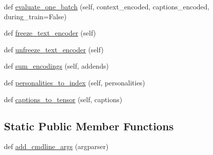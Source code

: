 \begin{DoxyCompactItemize}
\item 
def \hyperlink{classprojects_1_1personality__captions_1_1transresnet_1_1modules_1_1TransresnetModel_aeabd7be189bc8127923aa8b424615110}{evaluate\+\_\+one\+\_\+batch} (self, context\+\_\+encoded, captions\+\_\+encoded, during\+\_\+train=False)
\item 
def \hyperlink{classprojects_1_1personality__captions_1_1transresnet_1_1modules_1_1TransresnetModel_aace67e437e969262f0173158743e74ce}{freeze\+\_\+text\+\_\+encoder} (self)
\item 
def \hyperlink{classprojects_1_1personality__captions_1_1transresnet_1_1modules_1_1TransresnetModel_a7a9e68b5978bb8b9c681a9ce0015d3c3}{unfreeze\+\_\+text\+\_\+encoder} (self)
\item 
def \hyperlink{classprojects_1_1personality__captions_1_1transresnet_1_1modules_1_1TransresnetModel_a7e2f89c5290e2b0b13dd0891a07d761d}{sum\+\_\+encodings} (self, addends)
\item 
def \hyperlink{classprojects_1_1personality__captions_1_1transresnet_1_1modules_1_1TransresnetModel_a3d8ccc4b989803cc17f5976730016c6c}{personalities\+\_\+to\+\_\+index} (self, personalities)
\item 
def \hyperlink{classprojects_1_1personality__captions_1_1transresnet_1_1modules_1_1TransresnetModel_a923aaf397f8832bea4fcb82acc963465}{captions\+\_\+to\+\_\+tensor} (self, captions)
\end{DoxyCompactItemize}
\subsection*{Static Public Member Functions}
\begin{DoxyCompactItemize}
\item 
def \hyperlink{classprojects_1_1personality__captions_1_1transresnet_1_1modules_1_1TransresnetModel_a5d403cea2bcc3d1989bbd00c5d824d01}{add\+\_\+cmdline\+\_\+args} (argparser)
\end{DoxyCompactItemize}
